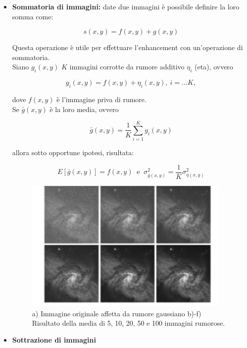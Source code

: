 \begin{itemize}
    \item \textbf{Sommatoria di immagini:} date due immagini è possibile
          definire la loro somma come:

          $$
              s(x,y) = f(x,y) + g(x,y)
          $$

          Questa operazione è utile per effettuare l'enhancement con
          un'operazione di sommatoria.\\

          Siano $g_i(x,y)$ $K$ immagini corrotte da rumore additivo $\eta_i$
          (eta), ovvero

          $$
              g_i(x,y) = f(x,y) + \eta_i(x,y), \ i=...K,
          $$

          dove $f(x,y)$ è l'immagine priva di rumore.\\
          Se $\bar{g}(x,y)$ è la loro media, ovvero

          $$
              \bar{g}(x,y)=\frac{1}{K} \sum_{i=1}^{K}g_i(x,y)
          $$

          allora sotto opportune ipotesi, risultata:

          $$
              E\left[\bar{g}(x,y)\right] = f(x,y) \ \text{ e } \ \sigma^2_{\bar{g}(x,y)}=\frac{1}{K}\sigma^2_{\eta(x,y)}
          $$

          \begin{figure}[H]
              \centering
              \includegraphics[width=10cm, keepaspectratio]{capitoli/immagini/imgs/sommatoria-immagini.png}
              \caption{a) Immagine originale affetta da rumore gaussiano b)-f)
                  Risultato della media di 5, 10, 20, 50 e 100 immagini
                  rumorose.}
          \end{figure}

    \item \textbf{Sottrazione di immagini}


\end{itemize}
